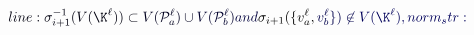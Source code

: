 \documentclass[12pt]{article}
\begin{document}
\makeatletter
\renewcommand*{\@textcolor}[3]{%
  \protect\leavevmode
  \begingroup
    \color#1{#2}#3%
  \endgroup
}
\makeatother
\begin{displaymath}
\mathcolor[RGB]{0,0,15}{line:
\sigma_{i+1}^{-1}(V(\K^\ell))\subset} \mathcolor[RGB]{0,0,30}{V(\mathcal{P}_a^\ell)\cup} \mathcolor[RGB]{0,0,45}{V(\mathcal{P}_b^\ell)\text{} \mathcolor[RGB]{0,0,60}{and} }\sigma_{i+1}(\{v_a^\ell, \mathcolor[RGB]{0,0,75}{v_b^\ell\})\not\in} \mathcolor[RGB]{0,0,90}{V(\K^\ell),

norm_str:}
\end{displaymath}
\end{document}
